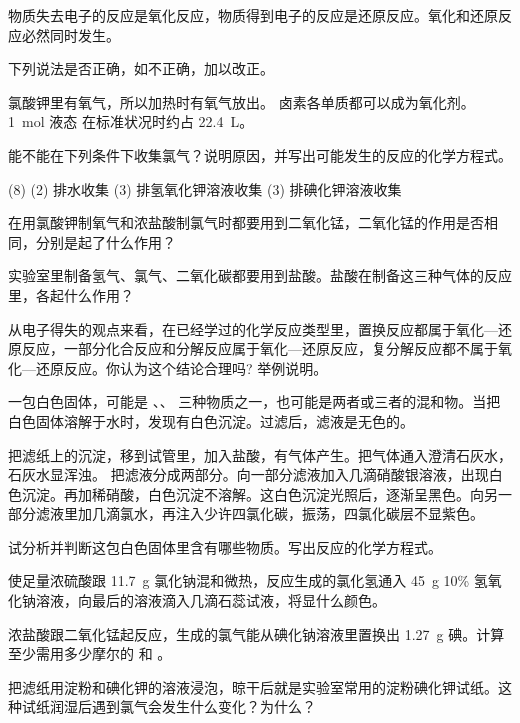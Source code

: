 物质失去电子的反应是氧化反应，物质得到电子的反应是还原反应。氧化和还原反应必然同时发生。
\begin{Review}
  \begin{question}
    \item 下列说法是否正确，如不正确，加以改正。
    \begin{tasks}
      \task 氯酸钾里有氧气，所以加热时有氧气放出。
      \task 卤素各单质都可以成为氧化剂。
      \task \qty{1}{mol} 液态  在标准状况时约占 \qty{22.4}{L}。
    \end{tasks}
    \item 能不能在下列条件下收集氯气？说明原因，并写出可能发生的反应的化学方程式。
    \begin{tasks}(8)
      \task*(2) 排水收集
      \task*(3) 排氢氧化钾溶液收集
      \task*(3) 排碘化钾溶液收集
    \end{tasks}
    \item 在用氯酸钾制氧气和浓盐酸制氯气时都要用到二氧化锰，二氧化锰的作用是否相同，分别是起了什么作用？
    \item 实验室里制备氢气、氯气、二氧化碳都要用到盐酸。盐酸在制备这三种气体的反应里，各起什么作用？
    \item 从电子得失的观点来看，在已经学过的化学反应类型里，置换反应都属于氧化—还原反应，一部分化合反应和分解反应属于氧化—还原反应，复分解反应都不属于氧化—还原反应。你认为这个结论合理吗? 举例说明。
    \item 一包白色固体，可能是 、、 三种物质之一，也可能是两者或三者的混和物。当把白色固体溶解于水时，发现有白色沉淀。过滤后，滤液是无色的。
    \begin{tasks}
      \task 把滤纸上的沉淀，移到试管里，加入盐酸，有气体产生。把气体通入澄清石灰水，石灰水显浑浊。
      \task 把滤液分成两部分。向一部分滤液加入几滴硝酸银溶液，出现白色沉淀。再加稀硝酸，白色沉淀不溶解。这白色沉淀光照后，逐渐呈黑色。向另一部分滤液里加几滴氯水，再注入少许四氯化碳，振荡，四氯化碳层不显紫色。
    \end{tasks}
    试分析并判断这包白色固体里含有哪些物质。写出反应的化学方程式。
    \item 使足量浓硫酸跟 \qty{11.7}{g} 氯化钠混和微热，反应生成的氯化氢通入 \qty{45}{g} 10\% 氢氧化钠溶液，向最后的溶液滴入几滴石蕊试液，将显什么颜色。
    \item 浓盐酸跟二氧化锰起反应，生成的氯气能从碘化钠溶液里置换出 \qty{1.27}{g} 碘。计算至少需用多少摩尔的  和  。
    \item 把滤纸用淀粉和碘化钾的溶液浸泡，晾干后就是实验室常用的淀粉碘化钾试纸。这种试纸润湿后遇到氯气会发生什么变化？为什么？
  \end{question}
\end{Review}